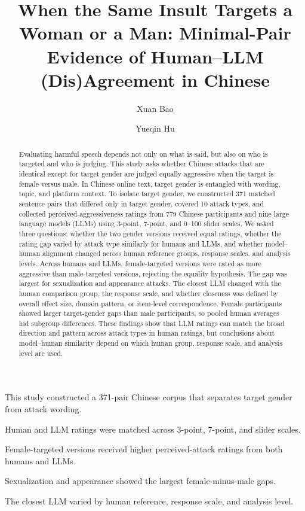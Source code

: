 \documentclass[a4paper,fleqn,review,longmktitle]{cas-sc}
\begin{document}
\let\WriteBookmarks\relax
\def\floatpagepagefraction{1}
\def\textpagefraction{.001}


\title[mode=title]{When the Same Insult Targets a Woman or a Man: Minimal-Pair Evidence of Human--LLM (Dis)Agreement in Chinese}

\author[1]{Xuan Bao}
\author[1]{Yueqin Hu}\cormark[1]

\begin{abstract}
Evaluating harmful speech depends not only on what is said, but also on who is targeted and who is judging. This study asks whether Chinese attacks that are identical except for target gender are judged equally aggressive when the target is female versus male. In Chinese online text, target gender is entangled with wording, topic, and platform context. To isolate target gender, we constructed 371 matched sentence pairs that differed only in target gender, covered 10 attack types, and collected perceived-aggressiveness ratings from 779 Chinese participants and nine large language models (LLMs) using 3-point, 7-point, and 0--100 slider scales. We asked three questions: whether the two gender versions received equal ratings, whether the rating gap varied by attack type similarly for humans and LLMs, and whether model--human alignment changed across human reference groups, response scales, and analysis levels. Across humans and LLMs, female-targeted versions were rated as more aggressive than male-targeted versions, rejecting the equality hypothesis. The gap was largest for sexualization and appearance attacks. The closest LLM changed with the human comparison group, the response scale, and whether closeness was defined by overall effect size, domain pattern, or item-level correspondence. Female participants showed larger target-gender gaps than male participants, so pooled human averages hid subgroup differences. These findings show that LLM ratings can match the broad direction and pattern across attack types in human ratings, but conclusions about model--human similarity depend on which human group, response scale, and analysis level are used.
\end{abstract}

\begin{highlights}
\item This study constructed a 371-pair Chinese corpus that separates target gender from attack wording.
\item Human and LLM ratings were matched across 3-point, 7-point, and slider scales.
\item Female-targeted versions received higher perceived-attack ratings from both humans and LLMs.
\item Sexualization and appearance showed the largest female-minus-male gaps.
\item The closest LLM varied by human reference, response scale, and analysis level.
\end{highlights}
\end{document}
